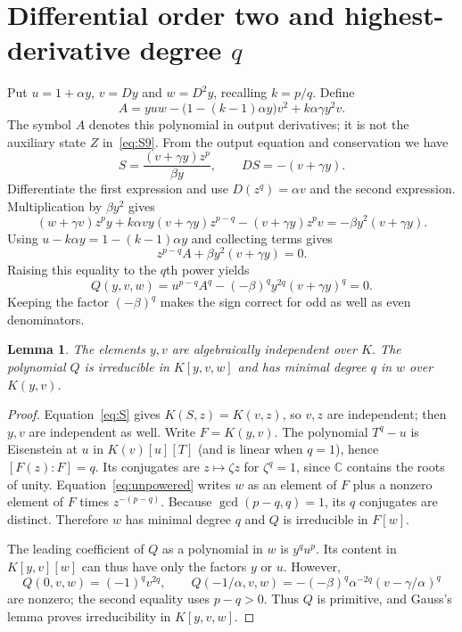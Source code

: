 \documentclass[10pt,a4paper]{article}
\newtheorem{lemma}[theorem]{Lemma}
\theoremstyle{definition}\newtheorem{definition}[theorem]{Definition}
\newcommand{\C}{\mathbb C}
\begin{document}
\section{Differential order two and highest-derivative degree \texorpdfstring{$q$}{q}}
\label{sec:io}
Put $u=1+\alpha y$, $v=Dy$ and $w=D^2y$, recalling $k=p/q$. Define
\begin{equation}
A=yu w-\bigl(1-(k-1)\alpha y\bigr)v^2+k\alpha\gamma y^2v.
\label{eq:A}
\end{equation}
The symbol $A$ denotes this polynomial in output derivatives; it is
not the auxiliary state $Z$ in~\eqref{eq:S9}.
From the output equation and conservation we have
\begin{equation}
S=\frac{(v+\gamma y)z^p}{\beta y},\qquad DS=-(v+\gamma y).
\label{eq:S}
\end{equation}
Differentiate the first expression and use $D(z^q)=\alpha v$ and the
second expression. Multiplication by $\beta y^2$ gives
\[
(w+\gamma v)z^p y+k\alpha vy(v+\gamma y)z^{p-q}
-(v+\gamma y)z^p v=-\beta y^2(v+\gamma y).
\]
Using $u-k\alpha y=1-(k-1)\alpha y$ and collecting terms gives
\begin{equation}
z^{p-q}A+\beta y^2(v+\gamma y)=0.
\label{eq:unpowered}
\end{equation}
Raising this equality to the $q$th power yields
\begin{equation}
Q(y,v,w)=u^{p-q}A^q-(-\beta)^q y^{2q}(v+\gamma y)^q=0.
\label{eq:Q}
\end{equation}
Keeping the factor $(-\beta)^q$ makes the sign correct for odd as well
as even denominators.

\begin{lemma}
\label{lem:minimal}
The elements $y,v$ are algebraically independent over $K$. The
polynomial $Q$ is irreducible in $K[y,v,w]$ and has minimal degree
$q$ in $w$ over $K(y,v)$.
\end{lemma}
\begin{proof}
Equation~\eqref{eq:S} gives $K(S,z)=K(v,z)$, so $v,z$ are independent;
then $y,v$ are independent as well. Write $F=K(y,v)$. The polynomial
$T^q-u$ is Eisenstein at $u$ in $K(v)[u][T]$ (and is linear when
$q=1$), hence $[F(z):F]=q$. Its conjugates are $z\mapsto\zeta z$ for
$\zeta^q=1$, since $\C$ contains the roots of unity.
Equation~\eqref{eq:unpowered} writes $w$ as an element of $F$ plus a
nonzero element of $F$ times $z^{-(p-q)}$. Because
$\gcd(p-q,q)=1$, its $q$ conjugates are distinct. Therefore $w$ has
minimal degree $q$ and $Q$ is irreducible in $F[w]$.

The leading coefficient of $Q$ as a polynomial in $w$ is $y^q u^p$.
Its content in $K[y,v][w]$ can thus have only the factors $y$ or $u$.
However,
\begin{equation}
Q(0,v,w)=(-1)^qv^{2q},\qquad
Q(-1/\alpha,v,w)=-(-\beta)^q\alpha^{-2q}(v-\gamma/\alpha)^q
\label{eq:content}
\end{equation}
are nonzero; the second equality uses $p-q>0$.
Thus $Q$ is primitive, and Gauss's lemma proves irreducibility in
$K[y,v,w]$.
\end{proof}
\end{document}
